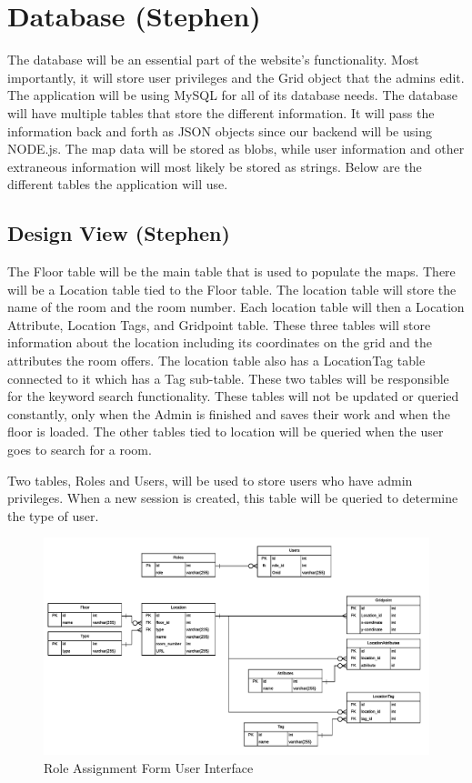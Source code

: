 \documentclass[letterpaper,10pt,titlepage, onecolumn, compsoc]{IEEEtran}
\begin{document}
\section{Database (Stephen)}
The database will be an essential part of the website's functionality. Most importantly, it will store user privileges and the Grid object that the admins edit. The application will be using MySQL for all of its database needs. The database will have multiple tables that store the different information. It will pass the information back and forth as JSON objects since our backend will be using NODE.js. The map data will be stored as blobs, while user information and other extraneous information will most likely be stored as strings. Below are the different tables the application will use.
\subsection{Design View (Stephen)}
The Floor table will be the main table that is used to populate the maps. There will be a Location table tied to the Floor table. The location table will store the name of the room and the room number. Each location table will then a Location Attribute, Location Tags, and Gridpoint table. These three tables will store information about the location including its coordinates on the grid and the attributes the room offers. The location table also has a LocationTag table connected to it which has a Tag sub-table. These two tables will be responsible for the keyword search functionality.  These tables will not be updated or queried constantly, only when the Admin is finished and saves their work and when the floor is loaded. The other tables tied to location will be queried when the user goes to search for a room. 

Two tables, Roles and Users, will be used to store users who have admin privileges. When a new session is created, this table will be queried to determine the type of user.

\begin{figure}[h!]
\centering
\hspace*{-.5in}
\includegraphics[scale=.65]{images/libnav-database-schema.png}
\caption{Role Assignment Form User Interface}
\label{fig:method}
\end{figure}
\end{document}
